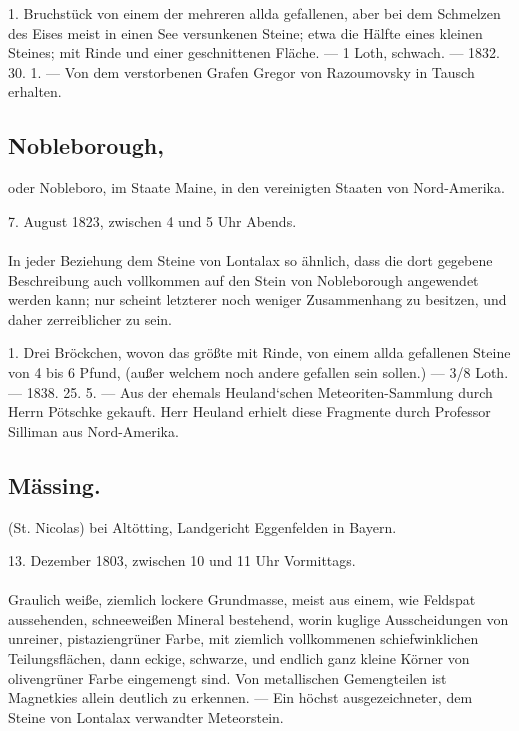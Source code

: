 \documentclass[a4paper, 11pt, oneside, polutonikogreek, german]{article}
\begin{document}
1. Bruchstück von einem der mehreren allda gefallenen, aber bei dem Schmelzen des Eises meist in einen See versunkenen Steine; etwa die Hälfte eines kleinen Steines; mit Rinde und einer geschnittenen Fläche. — 1 Loth, schwach. — 1832. 30. 1. — Von dem verstorbenen Grafen Gregor von Razoumovsky in Tausch erhalten.
\subsection{Nobleborough,}
\begin{center}
\small
oder Nobleboro, im Staate Maine, in den vereinigten Staaten von Nord-Amerika.

7. August 1823, zwischen 4 und 5 Uhr Abends.
\end{center}
\paragraph{}
In jeder Beziehung dem Steine von Lontalax so ähnlich, dass die dort gegebene Beschreibung auch vollkommen auf den Stein von Nobleborough angewendet werden kann; nur scheint letzterer noch weniger Zusammenhang zu besitzen, und daher zerreiblicher zu sein.

1. Drei Bröckchen, wovon das größte mit Rinde, von einem allda gefallenen Steine von 4 bis 6 Pfund, (außer welchem noch andere gefallen sein sollen.) — 3/8 Loth. — 1838. 25. 5. — Aus der ehemals Heuland‘schen Meteoriten-Sammlung durch Herrn Pötschke gekauft. Herr Heuland erhielt diese Fragmente durch Professor Silliman aus Nord-Amerika.
\subsection{Mässing.}
\begin{center}
\small
(St. Nicolas) bei Altötting, Landgericht Eggenfelden in Bayern.

13. Dezember 1803, zwischen 10 und 11 Uhr Vormittags.
\end{center}
\paragraph{}
Graulich weiße, ziemlich lockere Grundmasse, meist aus einem, wie Feldspat aussehenden, schneeweißen Mineral bestehend‚ worin kuglige Ausscheidungen von unreiner, pistaziengrüner Farbe, mit ziemlich vollkommenen schiefwinklichen Teilungsflächen, dann eckige, schwarze, und endlich ganz kleine Körner von olivengrüner Farbe eingemengt sind. Von metallischen Gemengteilen ist Magnetkies allein deutlich zu erkennen. — Ein höchst ausgezeichneter, dem Steine von Lontalax verwandter Meteorstein.
\end{document}
